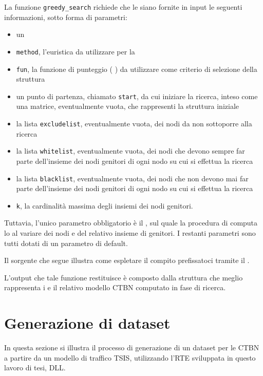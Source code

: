 La funzione \lstinline[language=rstats]{greedy_search} richiede che le siano fornite in input le seguenti informazioni, sotto forma di parametri:
\begin{itemize}
	\item un \emph{}
	\item \lstinline$method$, l'euristica da utilizzare per la 
	\item \lstinline$fun$, la funzione di punteggio (\ie{} \emph{}) da utilizzare come criterio di selezione della struttura
	\item un punto di partenza, chiamato \lstinline$start$, da cui iniziare la ricerca, inteso come una matrice, eventualmente vuota, che rappresenti la struttura iniziale
	\item la lista \lstinline$excludelist$, eventualmente vuota, dei nodi da non sottoporre alla ricerca
	\item la lista \lstinline$whitelist$, eventualmente vuota, dei nodi che devono sempre far parte dell'insieme dei nodi genitori di ogni nodo su cui si effettua la ricerca
	\item la lista \lstinline$blacklist$, eventualmente vuota, dei nodi che non devono mai far parte dell'insieme dei nodi genitori di ogni nodo su cui si effettua la ricerca
	\item \lstinline$k$, la cardinalità massima degli insiemi dei nodi genitori.
\end{itemize}
Tuttavia, l'unico parametro obbligatorio è il \emph{}, sul quale la procedura di  computa lo \emph{} al variare dei nodi e del relativo insieme di genitori. I restanti parametri sono tutti dotati di un parametro di default.

Il sorgente che segue illustra come espletare il compito prefissatoci tramite il \pacchettor{}.

\vspace*{8pt}

L'output che tale funzione restituisce è composto dalla struttura che meglio rappresenta i  e il relativo modello \acs{CTBN} computato in fase di ricerca.

\section{Generazione di dataset}\label{sec:create-dataset-howto}
In questa sezione si illustra il processo di generazione di un dataset per le \acs{CTBN} a partire da un modello di traffico \acs{TSIS}, utilizzando l'\acl{RTE} sviluppata in questo lavoro di tesi,  \acs{DLL}.

